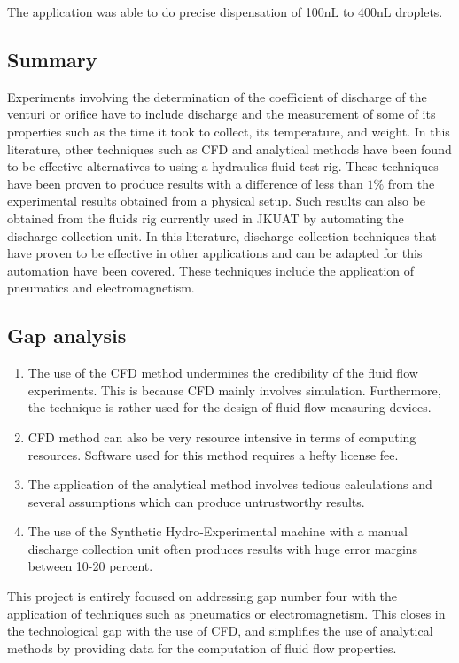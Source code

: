 The application was able to do precise dispensation of 100nL to 400nL droplets.

\subsection{Summary}

Experiments involving the determination of the coefficient of discharge of the venturi or orifice have to include discharge and the measurement of some of its properties such as the time it took to collect, its temperature, and weight. In this literature, other techniques such as CFD and analytical methods have been found to be effective alternatives to using a hydraulics fluid test rig. These techniques have been proven to produce results with a difference of less than $1\%$  from the experimental results obtained from a physical setup. Such results can also be obtained from the fluids rig currently used in JKUAT by automating the discharge collection unit. In this literature, discharge collection techniques that have proven to be effective in other applications and can be adapted for this automation have been covered. These techniques include the application of pneumatics and electromagnetism. 

\subsection{Gap analysis}
\begin{enumerate}
    \item The use of the CFD method undermines the credibility of the fluid flow experiments. This is because CFD mainly involves simulation. Furthermore, the technique is rather used for the design of fluid flow measuring devices.
    \item CFD method can also be very resource intensive in terms of computing resources. Software used for this method requires a hefty license fee.
    \item The application of the analytical method involves tedious calculations and several assumptions which can produce untrustworthy results.
    \item The use of the Synthetic Hydro-Experimental machine with a manual discharge collection unit often produces results with huge error margins between 10-20 percent. 
\end{enumerate}

This project is entirely focused on addressing gap number four with the application of techniques such as pneumatics or electromagnetism. This closes in the technological gap with the use of CFD, and simplifies the use of analytical methods by providing data for the computation of fluid flow properties.    





